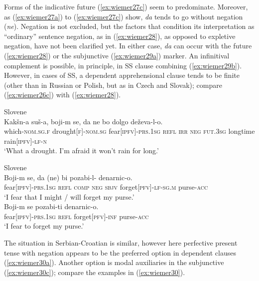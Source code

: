 \documentclass[output=paper,colorlinks,citecolor=brown]{langscibook}
\begin{document}
\noindent Forms of the indicative future (\ref{ex:wiemer27c}) seem to predominate. Moreover, as (\ref{ex:wiemer27a}) to (\ref{ex:wiemer27c}) show, \textit{da} tends to go without negation (\textit{ne}). Negation is not excluded, but the factors that condition its interpretation as ``ordinary'' sentence negation, as in (\ref{ex:wiemer28}), as opposed to expletive negation, have not been clarified yet. In either case, \textit{da} can occur with the future (\ref{ex:wiemer28}) or the subjunctive (\ref{ex:wiemer29a}) marker. An infinitival complement is possible, in principle, in SS clause combining (\ref{ex:wiemer29b}). However, in cases of SS, a dependent apprehensional clause tends to be finite (other than in Russian or Polish, but as in Czech and Slovak); compare (\ref{ex:wiemer26c}) with (\ref{ex:wiemer28}).


\ea 
\label{ex:wiemer28} \textnormal{Slovene} \\
\gll Kakšn-a suš-a, boji-m se, da ne bo dolgo deževa-l-o. \\
which-\textsc{nom.sg.f} drought\textsc{[f]-nom.sg} fear\textsc{[ipfv]-prs.1sg} \textsc{refl} \textsc{irr} \textsc{neg} \textsc{fut.3sg} long\textunderscore time rain\textsc{[ipfv]-lf-n} \\
\glt `What a drought. I'm afraid it won't rain for long.'
\z


\ea
\label{ex:wiemer29} \textnormal{Slovene} \\
\ea \label{ex:wiemer29a} \gll Boji-m se, da (ne) bi pozabi-l-\emptyset {} denarnic-o. \\
fear\textsc{[ipfv]-prs.1sg} \textsc{refl} \textsc{comp} \textsc{neg} \textsc{sbjv} forget\textsc{[pfv]-lf-sg.m} purse-\textsc{acc} \\
\glt `I fear that I might / will forget my purse.' \\
\ex \label{ex:wiemer29b}
\gll Boji-m se pozabi-ti denarnic-o. \\
fear\textsc{[ipfv]-prs.1sg} \textsc{refl} forget\textsc{[pfv]-inf} purse-\textsc{acc} \\
\glt `I fear to forget my purse.'
\z
\z



 The situation in Serbian-Croatian is similar, however here perfective present tense with negation appears to be the preferred option in dependent clauses (\ref{ex:wiemer30a}). Another option is modal auxiliaries in the subjunctive (\ref{ex:wiemer30c}); compare the examples in (\ref{ex:wiemer30}).
\end{document}
